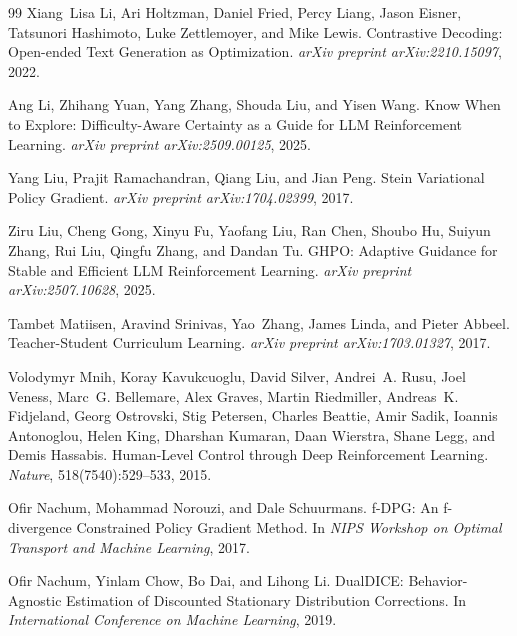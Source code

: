 \documentclass{article}
\begin{document}
\begin{thebibliography}{99}
Xiang~Lisa Li, Ari Holtzman, Daniel Fried, Percy Liang, Jason Eisner, Tatsunori Hashimoto, Luke Zettlemoyer, and Mike Lewis.
\newblock Contrastive Decoding: Open-ended Text Generation as Optimization.
\newblock \emph{arXiv preprint arXiv:2210.15097}, 2022.

Ang Li, Zhihang Yuan, Yang Zhang, Shouda Liu, and Yisen Wang.
\newblock Know When to Explore: Difficulty-Aware Certainty as a Guide for LLM Reinforcement Learning.
\newblock \emph{arXiv preprint arXiv:2509.00125}, 2025.

Yang Liu, Prajit Ramachandran, Qiang Liu, and Jian Peng.
\newblock Stein Variational Policy Gradient.
\newblock \emph{arXiv preprint arXiv:1704.02399}, 2017.

Ziru Liu, Cheng Gong, Xinyu Fu, Yaofang Liu, Ran Chen, Shoubo Hu, Suiyun Zhang, Rui Liu, Qingfu Zhang, and Dandan Tu.
\newblock GHPO: Adaptive Guidance for Stable and Efficient LLM Reinforcement Learning.
\newblock \emph{arXiv preprint arXiv:2507.10628}, 2025.

Tambet Matiisen, Aravind Srinivas, Yao~Zhang, James Linda, and Pieter Abbeel.
\newblock Teacher-Student Curriculum Learning.
\newblock \emph{arXiv preprint arXiv:1703.01327}, 2017.

Volodymyr Mnih, Koray Kavukcuoglu, David Silver, Andrei~A. Rusu, Joel Veness, Marc~G. Bellemare, Alex Graves, Martin Riedmiller, Andreas~K. Fidjeland, Georg Ostrovski, Stig Petersen, Charles Beattie, Amir Sadik, Ioannis Antonoglou, Helen King, Dharshan Kumaran, Daan Wierstra, Shane Legg, and Demis Hassabis.
\newblock Human-Level Control through Deep Reinforcement Learning.
\newblock \emph{Nature}, 518(7540):529--533, 2015.

Ofir Nachum, Mohammad Norouzi, and Dale Schuurmans.
\newblock f-DPG: An f-divergence Constrained Policy Gradient Method.
\newblock In \emph{NIPS Workshop on Optimal Transport and Machine Learning}, 2017.

Ofir Nachum, Yinlam Chow, Bo Dai, and Lihong Li.
\newblock DualDICE: Behavior-Agnostic Estimation of Discounted Stationary Distribution Corrections.
\newblock In \emph{International Conference on Machine Learning}, 2019.


\end{thebibliography}
\end{document}
